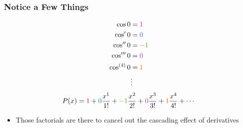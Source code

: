 \documentclass{beamer}
\begin{document}


\begin{frame}
  \frametitle{Notice a Few Things}
  \begin{align*}
    \cos 0 & = \textcolor{r}{1} \\
    \cos' 0 & = \textcolor{b}{0} \\
    \cos'' 0 & = \textcolor{g}{-1} \\
    \cos''' 0 & = \textcolor{p}{0} \\
    \cos^{(4)} 0 & = \textcolor{o}{1} \\
    & \vdots
  \end{align*}
  \begin{equation*}
    P(x) = \textcolor{r}{1} + \textcolor{b}{0}\frac{x^1}{1!} + \textcolor{g}{-1}\frac{x^2}{2!} + \textcolor{p}{0}\frac{x^3}{3!} + \textcolor{o}{1}\frac{x^4}{4!} + \cdots
  \end{equation*}
  \begin{itemize}
    \item Those factorials are there to cancel out the cascading effect of derivatives
  \end{itemize}
\end{frame}
\end{document}
